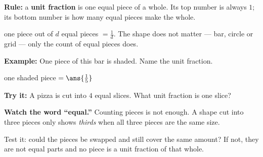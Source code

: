 \documentclass[12pt]{article}
\begin{document}


\begin{formulabox}
\textbf{Rule:} a \textbf{unit fraction} is one equal piece of a whole. Its top number is always $1$;
its bottom number is how many equal pieces make the whole.\par
one piece out of $d$ equal pieces $= \frac{1}{d}$. \quad The shape does not matter --- bar, circle or
grid --- only the count of equal pieces does.
\end{formulabox}

\begin{examplebox}
\textbf{Example:} \quad One piece of this bar is shaded. Name the unit fraction.
\par\vspace{2pt}
\begin{center}
\end{center}

one shaded piece $= \ans{\tfrac{1}{5}}$
\end{examplebox}

\begin{tryitbox}
\textbf{Try it:} \quad A pizza is cut into $4$ equal slices. What unit fraction is one slice?\\[2pt]
\end{tryitbox}


\begin{formulabox}
\textbf{Watch the word ``equal.''} Counting pieces is not enough. A shape cut into three pieces only
shows \emph{thirds} when all three pieces are the same size.\par
Test it: could the pieces be swapped and still cover the same amount? If not, they are not equal
parts and no piece is a unit fraction of that whole.
\end{formulabox}
\end{document}
